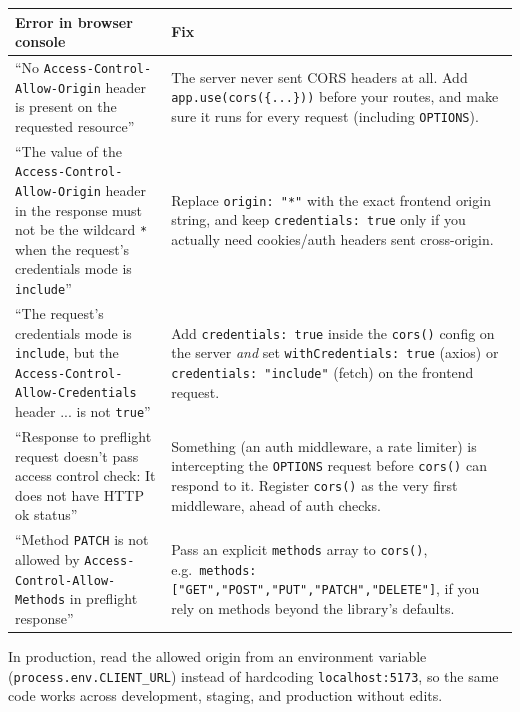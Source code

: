 \begin{table}[h]
\centering
\begin{tabularx}{\textwidth}{X X}
\toprule
\textbf{Error in browser console} & \textbf{Fix} \\
\midrule
``No \texttt{Access-Control-Allow-Origin} header is present on the requested
resource'' &
The server never sent CORS headers at all. Add \texttt{app.use(cors(\{...\}))}
before your routes, and make sure it runs for every request (including
\texttt{OPTIONS}). \\
\addlinespace
``The value of the \texttt{Access-Control-Allow-Origin} header in the
response must not be the wildcard \texttt{*} when the request's credentials
mode is \texttt{include}'' &
Replace \texttt{origin: "*"} with the exact frontend origin string, and keep
\texttt{credentials: true} only if you actually need cookies/auth headers
sent cross-origin. \\
\addlinespace
``The request's credentials mode is \texttt{include}, but the
\texttt{Access-Control-Allow-Credentials} header ... is not \texttt{true}'' &
Add \texttt{credentials: true} inside the \texttt{cors()} config on the
server \emph{and} set \texttt{withCredentials: true} (axios) or
\texttt{credentials: "include"} (fetch) on the frontend request. \\
\addlinespace
``Response to preflight request doesn't pass access control check: It does
not have HTTP ok status'' &
Something (an auth middleware, a rate limiter) is intercepting the
\texttt{OPTIONS} request before \texttt{cors()} can respond to it. Register
\texttt{cors()} as the very first middleware, ahead of auth checks. \\
\addlinespace
``Method \texttt{PATCH} is not allowed by \texttt{Access-Control-Allow-Methods}
in preflight response'' &
Pass an explicit \texttt{methods} array to \texttt{cors()}, e.g.\
\texttt{methods: ["GET","POST","PUT","PATCH","DELETE"]}, if you rely on
methods beyond the library's defaults. \\
\bottomrule
\end{tabularx}
\end{table}

\begin{tipbox}[TIP]
In production, read the allowed origin from an environment variable
(\texttt{process.env.CLIENT\_URL}) instead of hardcoding
\texttt{localhost:5173}, so the same code works across development,
staging, and production without edits.
\end{tipbox}
